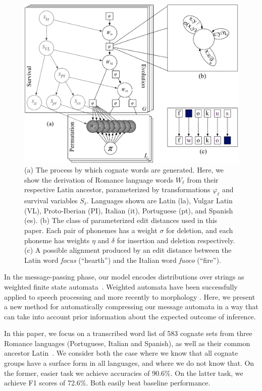 \documentclass[11pt,a4paper]{article}
\begin{document}
\begin{figure}
  \centering
  \includegraphics[scale=0.35]{gmodel}
  \caption{(a) The process by which cognate words are generated.
  Here, we show the derivation of Romance language words $W_\ell$
  from their respective Latin ancestor, parameterized by transformations
  $\varphi_\ell$ and survival variables $S_\ell$. Languages shown are
  Latin (la), Vulgar Latin (VL), Proto-Iberian (PI), Italian (it),
  Portuguese (pt), and Spanish (es). 
  (b) The class of parameterized edit distances used in this paper.
  Each pair of phonemes has a weight $\sigma$ for deletion, and
  each phoneme has weights $\eta$ and $\delta$ for insertion and
  deletion respectively.
  (c) A possible alignment produced by an edit distance between the
  Latin word \textit{focus} (``hearth'') and the Italian word \textit{fuoco} (``fire'').
  } \label{fig:gmodel}
\end{figure}

In the message-passing phase, our model encodes distributions over
strings as weighted finite state automata~\cite{mohri09weighted}.
Weighted automata have been successfully applied to speech processing
\cite{Mohri96weightedautomata} and more recently to morphology
\cite{dreyer2009graphical}.  Here, we present a new method for
automatically compressing our message automata in a way that can
take into account prior information about the expected outcome of
inference.

In this paper, we focus on a transcribed word list of 583 cognate
sets from three Romance languages (Portuguese, Italian and Spanish),
as well as their common ancestor Latin~\cite{bouchard07probabilistic}.
We consider both the case where we know that all cognate groups
have a surface form in all languages, and where we do not know that.
On the former, easier task we achieve accuracies of 90.6\%. On the
latter task, we achieve F1 scores of 72.6\%. Both easily beat baseline
performance.
\end{document}
